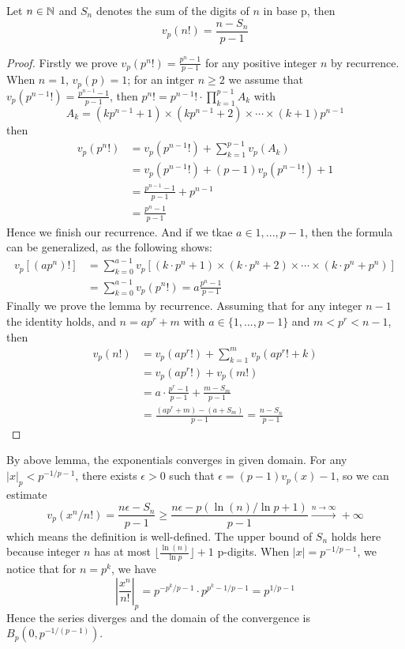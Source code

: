 \begin{lemma}
    Let \(n \in \mathbb{N}\) and \(S_n\) denotes the sum of the digits of \(n\) in base p, then 
    \[v_p(n!) =  \frac{n-S_n}{p-1}\]

    \begin{proof}
        Firstly we prove \(v_p(p^n!) = \frac{p^n-1}{p-1}\) for any positive integer \(n\) by recurrence. When \(n=1\), \(v_p(p) = 1\); for an intger \(n \geq 2\) we assume that \(v_p(p^{n-1}!) = \frac{p^{n-1}-1}{p-1}\), then \(p^n! = p^{n-1}! \cdot \prod_{k=1}^{p-1} A_k\) with
        \[A_k = (kp^{n-1}+1) \times (kp^{n-1}+2)\times \cdots \times (k+1)p^{n-1}\]
        then
        \begin{align*}
            v_p(p^n !) &= v_p(p^{n-1}!) + \sum_{k=1}^{p-1}v_p(A_k)\\
            &= v_p(p^{n-1}!) + (p-1)v_p(p^{n-1}!)+1 \\
            &= \frac{p^{n-1}-1}{p-1}+p^{n-1} \\
            &= \frac{p^{n}-1}{p-1}
        \end{align*}
        Hence we finish our recurrence. And if we tkae \(a \in {1,...,p-1}\), then the formula can be generalized, as the following shows:
        \begin{align*}
            v_p[(ap^n)!] &= \sum_{k=0}^{a-1}v_p[(k\cdot p^n +1)\times(k\cdot p^n +2) \times \cdots \times  (k\cdot p^n + p^n)] \\
            &= \sum_{k=0}^{a-1}v_p(p^n!) = a\frac{p^n-1}{p-1}
        \end{align*}
        Finally we prove the lemma by recurrence. Assuming that for any integer \(n-1\) the identity holds, and \(n= ap^r+m\) with \(a \in \{1,...,p-1\} \) and \(m<p^r<n-1\), then
        \begin{align*}
            v_p(n!) &= v_p(ap^r!)+\sum_{k=1}^{m}v_p(ap^r!+k)\\
            &= v_p(ap^r!)+v_p(m!) \\
            &= a\cdot \frac{p^r-1}{p-1}+\frac{m-S_m}{p-1}\\
            &= \frac{(ap^r+m)-(a+S_m)}{p-1} = \frac{n-S_n}{p-1}
        \end{align*}
    \end{proof}
\end{lemma}

By above lemma, the exponentials converges in given domain. For any \(|x|_p < p^{-1/p-1}\), there exists \(\epsilon>0\) such that \(\epsilon = (p-1)v_p(x)-1\), so we can estimate
\[v_p(x^n/n!) = \frac{n\epsilon-S_n}{p-1} \geq \frac{n\epsilon-p(\ln(n)/\ln p+1)}{p-1} \xrightarrow{n \rightarrow \infty} +\infty\]
which means the definition is well-defined. The upper bound of \(S_n\) holds here because integer \(n\) has at most \(\lfloor\frac{\ln(n)}{\ln p}\rfloor+1\) p-digits. When \(|x| = p^{-1/p-1}\), we notice that for \(n = p^k\), we have
\[|\frac{x^n}{n!}|_p  = p^{-p^k/p-1}\cdot p^{p^k-1/p-1} = p^{1/p-1} \]
Hence  the series diverges and the domain of the convergence is \(B_p(0,p^{-1/(p-1)})\). 
\newline


